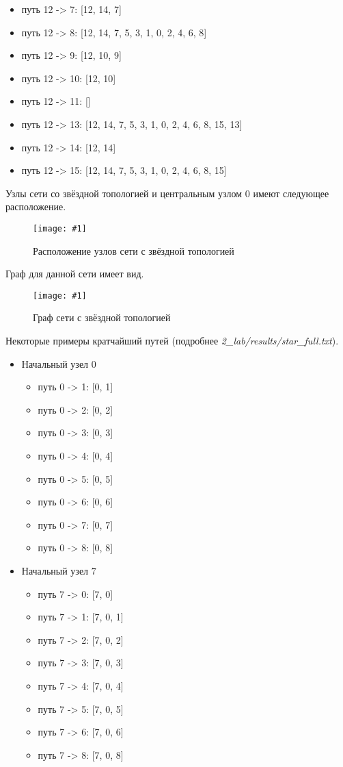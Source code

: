 \documentclass[a4paper,12pt]{article}
\newcommand{\plot}[3]{
    \begin{figure}[H]
        \begin{center}
            \texttt{[image: \#1]}
            \caption{#2}
            \label{#3}
        \end{center}
    \end{figure}
}
\begin{document}
\begin{itemize}
\begin{itemize}
            \item путь 12 -> 7: [12, 14, 7]
            \item путь 12 -> 8: [12, 14, 7, 5, 3, 1, 0, 2, 4, 6, 8]
            \item путь 12 -> 9: [12, 10, 9]
            \item путь 12 -> 10: [12, 10]
            \item путь 12 -> 11: []
            \item путь 12 -> 13: [12, 14, 7, 5, 3, 1, 0, 2, 4, 6, 8, 15, 13]
            \item путь 12 -> 14: [12, 14]
            \item путь 12 -> 15: [12, 14, 7, 5, 3, 1, 0, 2, 4, 6, 8, 15]
        \end{itemize}
    \end{itemize}

    Узлы сети со звёздной топологией и центральным узлом $ 0 $ имеют следующее расположение.
    \plot{full_star_points}{Расположение узлов сети с звёздной топологией}{p:fullStarPoints}

    Граф для данной сети имеет вид.
    \plot{full_star}{Граф сети с звёздной топологией}{p:fullStar}

    Некоторые примеры кратчайший путей (подробнее \textsl{2\_lab/results/star\_full.txt}).
    \begin{itemize}
        \item Начальный узел $ 0 $
        \begin{itemize}
            \item путь 0 -> 1: [0, 1]
            \item путь 0 -> 2: [0, 2]
            \item путь 0 -> 3: [0, 3]
            \item путь 0 -> 4: [0, 4]
            \item путь 0 -> 5: [0, 5]
            \item путь 0 -> 6: [0, 6]
            \item путь 0 -> 7: [0, 7]
            \item путь 0 -> 8: [0, 8]
        \end{itemize}
        \item Начальный узел $ 7 $
        \begin{itemize}
            \item путь 7 -> 0: [7, 0]
            \item путь 7 -> 1: [7, 0, 1]
            \item путь 7 -> 2: [7, 0, 2]
            \item путь 7 -> 3: [7, 0, 3]
            \item путь 7 -> 4: [7, 0, 4]
            \item путь 7 -> 5: [7, 0, 5]
            \item путь 7 -> 6: [7, 0, 6]
            \item путь 7 -> 8: [7, 0, 8]
        \end{itemize}
    \end{itemize}
\end{document}
